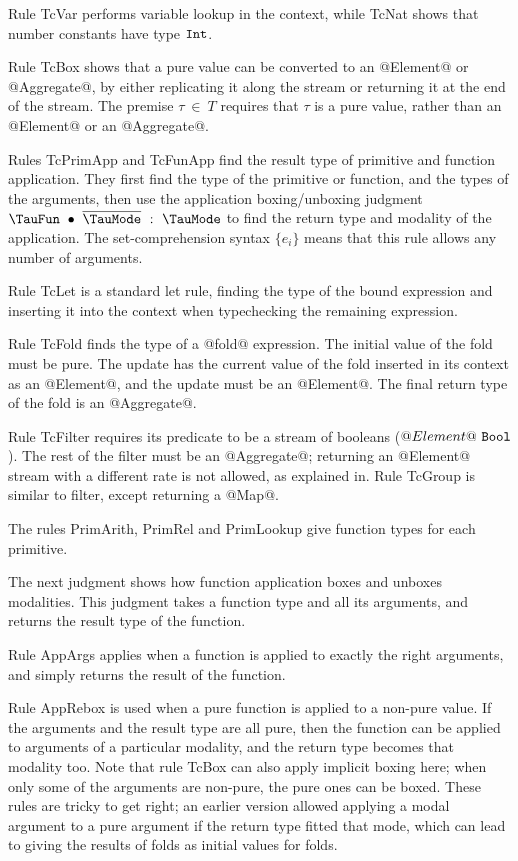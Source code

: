 Rule TcVar performs variable lookup in the context, while TcNat shows that number constants have type $\mathtt{Int}$.

Rule TcBox shows that a pure value can be converted to an @Element@ or @Aggregate@, by either replicating it along the stream or returning it at the end of the stream.
The premise $\tau~\in~T$ requires that $\tau$ is a pure value, rather than an @Element@ or an @Aggregate@.

Rules TcPrimApp and TcFunApp find the result type of primitive and function application.
They first find the type of the primitive or function, and the types of the arguments, then use the application boxing/unboxing judgment $\TypecheckApp{\TauFun}{\ov{\TauMode}}{\TauMode}$ to find the return type and modality of the application.
The set-comprehension syntax $\{e_i\}$ means that this rule allows any number of arguments.

Rule TcLet is a standard let rule, finding the type of the bound expression and inserting it into the context when typechecking the remaining expression.

Rule TcFold finds the type of a @fold@ expression.
The initial value of the fold must be pure.
The update has the current value of the fold inserted in its context as an @Element@, and the update must be an @Element@.
The final return type of the fold is an @Aggregate@.

Rule TcFilter requires its predicate to be a stream of booleans ($@Element@~\mathtt{Bool}$).
The rest of the filter must be an @Aggregate@; returning an @Element@ stream with a different rate is not allowed, as explained in.
Rule TcGroup is similar to filter, except returning a @Map@.

The rules PrimArith, PrimRel and PrimLookup give function types for each primitive.

The next judgment shows how function application boxes and unboxes modalities.
This judgment takes a function type and all its arguments, and returns the result type of the function.

Rule AppArgs applies when a function is applied to exactly the right arguments, and simply returns the result of the function.

Rule AppRebox is used when a pure function is applied to a non-pure value.
If the arguments and the result type are all pure, then the function can be applied to arguments of a particular modality, and the return type becomes that modality too.
Note that rule TcBox can also apply implicit boxing here; when only some of the arguments are non-pure, the pure ones can be boxed.
These rules are tricky to get right; an earlier version allowed applying a modal argument to a pure argument if the return type fitted that mode, which can lead to giving the results of folds as initial values for folds.



